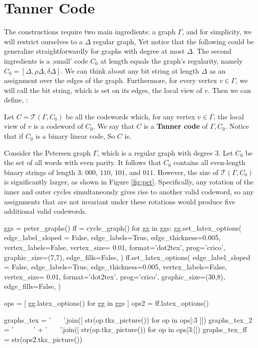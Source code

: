 \section{Tanner Code}
The constructions require two main ingredients: a graph $\Gamma$, and for simplicity, we will restrict ourselves to a $\Delta$ regular graph, Yet notice that the following could be generalize straightforwardly for graphs with degree at most $\Delta$. The second ingredients is a ;small' code $C_{0}$ at length equals the graph's regularity, namely $C_{0} = [\Delta,\rho\Delta, \delta\Delta]$. We can think about any bit string at length $\Delta$ as an assignment over the edges of the graph. Furthermore, for every vertex $v \in \Gamma$, we will call the bit string, which is set on its edges, the local view of $v$. Then we can define, \cite{Tanner}:
  \begin{definition}  Let $ C = \mathcal{T}\left( \Gamma, C_{0} \right)$  be all the codewords which, for any vertex $v\in \Gamma$, the local view of $v$ is a codeword of $C_{0}$. We say that $C$ is a \textbf{Tanner code}\label{Tan} of $\Gamma, C_{0}$. Notice that if $C_{0}$ is a binary linear code, So $C$ is.  
  \end{definition}
  \begin{example}
Consider the Petersen graph $\Gamma$, which is a regular graph with degree $3$. Let $C_{0}$ be the set of all words with even parity. It follows that $C_{0}$ contains all even-length binary strings of length $3$: $000$, $110$, $101$, and $011$. However, the size of $\mathcal{T}(\Gamma, C_{0})$ is significantly larger, as shown in Figure \cref{fig:pet}. Specifically, any rotation of the inner and outer cycles simultaneously gives rise to another valid codeword, so any assignments that are not invariant under these rotations would produce five additional valid codewords.

  \end{example}
\begin{sagesilent}
   
  
ggs = peter_graphs()
ff = cycle_graph()
for gg in ggs:
  gg.set_latex_options(
          edge_label_sloped = False,
          edge_labels=True,
          edge_thickness=0.005,
          vertex_labels=False,
          vertex_size= 0.01,
          format='dot2tex',
          prog='crico',
          graphic_size=(7,7),
          edge_fills=False,
      )
ff.set_latex_options(
          edge_label_sloped = False,
          edge_labels=True,
          edge_thickness=0.005,
          vertex_labels=False,
          vertex_size= 0.01,
          format='dot2tex',
          prog='crico',
          graphic_size=(30,8),
          edge_fills=False,
      )
 
ops = [ gg.latex_options() for gg in ggs ] 
ops2 = ff.latex_options()

graphs_tex =  ' \ \ \ '.join([  str(op.tkz_picture())  for op in ops[:3 ]])
graphs_tex_2 = ' \ \ \ \ \ ' +  ' \ \ \ '.join([  str(op.tkz_picture())  for op in ops[3:]])
graphs_tex_ff  = str(ops2.tkz_picture())
\end{sagesilent}

